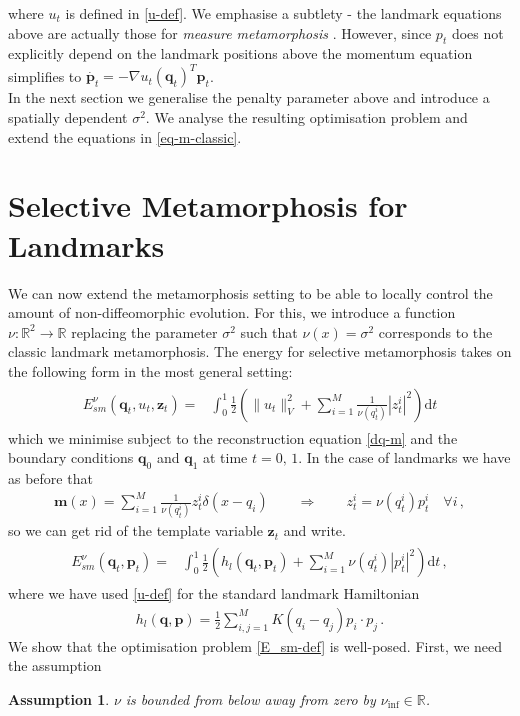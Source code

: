 \documentclass[runningheads]{llncs}
\newcommand{\half}{\frac 12}
\newcommand{\norm}[2]{\| #1 \|_{ #2 }}
\newcommand{\vnorm}[1]{\norm{ #1 }{V}}
\newcommand{\diff}[1]{\text{d} #1}
\newcommand{\nuinf}{\nu_\text{inf}}
\newtheorem{assumption}{Assumption}
\begin{document}
where $u_t$ is defined in \eqref{u-def}. We emphasise a subtlety - the landmark
equations above are actually those for \emph{measure metamorphosis}
\cite[Section 11.1, equation 33]{holm2009euler}. However, since $p_t$ does not
explicitly depend on the landmark positions above the momentum equation
simplifies to $\dot{\mathbf p_t} = - \nabla u_t(\mathbf q_t)^T \mathbf p_t$.\\

In the next section we generalise the penalty parameter above and introduce a
spatially dependent $\sigma^2$. We analyse the resulting optimisation problem
and extend the equations in \eqref{eq-m-classic}.

\section{Selective Metamorphosis for Landmarks}\label{sec:select_mm}

We can now extend the metamorphosis setting to be able to locally control the
amount of non-diffeomorphic evolution.  For this, we introduce a function $\nu:
\mathbb R^2\to \mathbb R$ replacing the parameter $\sigma^2$ such that
$\nu(x)=\sigma^2$ corresponds to the classic landmark metamorphosis. The energy
for selective metamorphosis takes on the following form in the most general
setting:
\begin{align}
  \begin{split}
    E_{sm}^\nu(\mathbf q_t, u_t, \mathbf z_t) = & \int_0^1
    \half  \left (\vnorm{u_t}^2 +\sum_{i=1}^M \frac{1}{\nu(q_t^i)}|z_t^i|^2\right )\diff{t}
  \end{split}
  \label{E_sm-def}
\end{align}
which we minimise subject to the reconstruction equation \eqref{dq-m} and the
boundary conditions $\mathbf q_0$ and $\mathbf q_1$ at time $t=0,\,1$. In the
case of landmarks we have as before that
\begin{align}\label{zp_relation}
  \mathbf m(x) = \sum_{i=1}^M \frac{1}{\nu(q_t^i)} z_t^i\delta(x-q_i)\qquad \Rightarrow \qquad
  z_t^i = \nu(q_t^i) p_t^i\quad \forall i\, , 
\end{align}
so we can get rid of the template variable $\mathbf z_t$ and write. 
\begin{align}
  \begin{split}
    E_{sm}^\nu(\mathbf q_t, \mathbf p_t) = & \int_0^1
    \half  \left (h_l(\mathbf q_t,\mathbf p_t)  +\sum_{i=1}^M \nu(q_t^i)|p_t^i|^2\right )\diff{t}\, , 
  \end{split}
  \label{E_sm-def_p}
\end{align}
where we have used \eqref{u-def} for the standard landmark Hamiltonian
\begin{align}
  h_l(\mathbf q, \mathbf p) =  \frac12 \sum_{i,j=1}^M K(q_i-q_j)p_i\cdot p_j\, . 
\label{hamiltonian}
\end{align}
We show that the optimisation problem \eqref{E_sm-def} is well-posed. First, we
need the assumption
\begin{assumption}\label{assumption:nu_bounded}
$\nu$ is bounded from below away from zero by $\nuinf \in \mathbb R$.
\end{assumption}
\end{document}
